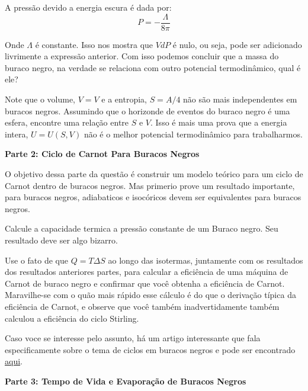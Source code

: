 \documentclass[11pt]{article}
\begin{document}
\begin{pproblem}
\begin{alternativas}
        \item A pressão devido a energia escura é dada por:
        \[P = -\frac{\Lambda}{8\pi}\]

        Onde \(\Lambda\) é constante. Isso nos mostra que \(VdP\) é nulo, ou seja, pode ser adicionado livrimente a expressão anterior. Com isso podemos concluir que a massa do buraco negro, na verdade se relaciona com outro potencial termodinâmico, qual é ele? 

        \item Note que o volume, \(V=V\) e a entropia, \(S = A/4\) não são mais independentes em buracos negros. Assumindo que o horizonde de eventos do buraco negro é uma esfera, encontre uma relação entre \(S\) e \(V\). Isso é mais uma prova que a energia intera, \(U = U(S, V)\) não é o melhor potencial termodinâmico para trabalharmos.
    \end{alternativas}

    \centering
    \textbf{Parte 2: Ciclo de Carnot Para Buracos Negros}
    
    \begin{alternativas}
        \item O objetivo dessa parte da questão é construir um modelo teórico para um ciclo de Carnot dentro de buracos negros. Mas primerio prove um resultado importante, para buracos negros, adiabaticos e isocóricos devem ser equivalentes para buracos negros.
        
        \item Calcule a capacidade termica a pressão constante de um Buraco negro. Seu resultado deve ser algo bizarro.
        
        \item Use o fato de que \(Q = T \Delta S\) ao longo das isotermas, juntamente com os resultados dos resultados anteriores partes, para calcular a eficiência de uma máquina de Carnot de buraco negro e confirmar que você
        obtenha a eficiência de Carnot. Maravilhe-se com o quão mais rápido esse cálculo é do que o
        derivação típica da eficiência de Carnot, e observe que você também inadvertidamente
        também calculou a eficiência do ciclo Stirling.

        Caso voce se interesse pelo assunto, há um artigo interessante que fala especificamente sobre o tema de ciclos em buracos negros e pode ser encontrado \href{https://arxiv.org/pdf/1404.5982}{aqui}.
    \end{alternativas}

    \centering
    \textbf{Parte 3: Tempo de Vida e Evaporação de Buracos Negros}
    

\end{pproblem}
\end{document}

